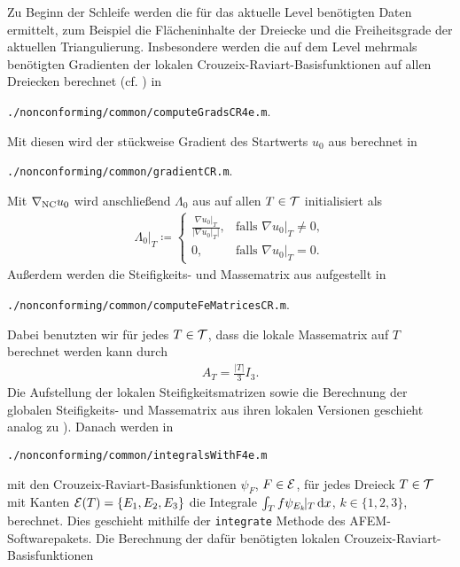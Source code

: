 Zu Beginn der Schleife werden die für das aktuelle Level benötigten Daten
ermittelt, zum Beispiel die Flächeninhalte der Dreiecke und die Freiheitsgrade
der aktuellen Triangulierung. 
Insbesondere werden die auf dem Level mehrmals benötigten Gradienten der
lokalen Crouzeix-Raviart-Basisfunktionen auf allen Dreiecken berechnet (cf.
\cite[Abschnitt 1.4.2]{CGKNRR10}) in
\begin{center}
  \texttt{./nonconforming/common/computeGradsCR4e.m}.
\end{center}
Mit diesen wird der stückweise Gradient des Startwerts $u_0$ aus
 berechnet in
\begin{center}
  \texttt{./nonconforming/common/gradientCR.m}.
\end{center}
Mit $\nabla_\textup{NC} u_0$ wird anschließend $\Lambda_0$ aus
 auf allen $T\in\mathcal{T}$ initialisiert als 
\begin{align*}
  \Lambda_0|_T\coloneqq
  \begin{cases}
    \frac{\nabla u_0|_T}{|\nabla u_0|_T|},&\text{falls }\nabla u_0|_T\neq 0,\\
    0,&\text{falls }\nabla u_0|_T= 0.
  \end{cases}
\end{align*}
Außerdem werden die Steifigkeits- und Massematrix aus
 aufgestellt in
\begin{center}
  \texttt{./nonconforming/common/computeFeMatricesCR.m}.
\end{center}
Dabei benutzten wir für jedes $T\in\mathcal{T}$, dass die lokale Massematrix auf
$T$ berechnet werden kann durch
\begin{align*}
  A_T
  =
  \frac{|T|}{3}I_3.
\end{align*}
Die Aufstellung der lokalen Steifigkeitsmatrizen sowie die Berechnung der
globalen Stei\-fig\-keits- und Massematrix aus ihren lokalen Versionen geschieht
analog zu \cite[Abschnitt 1.4.2]{CGKNRR10}).
Danach werden in
\begin{center}
  \texttt{./nonconforming/common/integralsWithF4e.m}
\end{center}
mit den Crouzeix-Raviart-Basisfunktionen
$\psi_F$, $F\in\mathcal{E}$, für jedes Dreieck $T\in\mathcal{T}$ mit Kanten
$\mathcal{E}(T)=\{E_1,E_2,E_3\}$ die Integrale $\int_T f\psi_{E_k}\!|_T\,\mathrm{d}x$,
$k\in\{1,2,3\}$, berechnet. 
Dies geschieht mithilfe der \texttt{integrate} Methode \cite[Abschnitt
1.8.2]{CGKNRR10} des AFEM-Softwarepakets.
Die Berechnung der dafür benötigten lokalen Crouzeix-Raviart-Basisfunktionen
